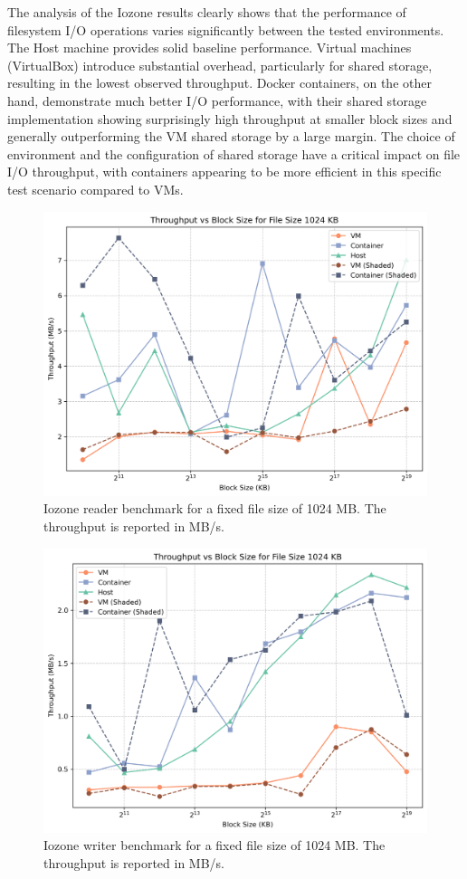 The analysis of the Iozone results clearly shows that the performance of filesystem I/O operations varies significantly between the tested environments. The Host machine provides solid baseline performance. Virtual machines (VirtualBox) introduce substantial overhead, particularly for shared storage, resulting in the lowest observed throughput. Docker containers, on the other hand, demonstrate much better I/O performance, with their shared storage implementation showing surprisingly high throughput at smaller block sizes and generally outperforming the VM shared storage by a large margin. The choice of environment and the configuration of shared storage have a critical impact on file I/O throughput, with containers appearing to be more efficient in this specific test scenario compared to VMs. 

\begin{figure}
    \centering
    \includegraphics[width=0.8\linewidth]{assets/reader_filesize_1024.png}
    \caption{Iozone reader benchmark for a fixed file size of 1024 MB. The throughput is reported in MB/s.}
    \label{fig:reader_filesize_1024}
\end{figure}

\begin{figure}
    \centering
    \includegraphics[width=0.8\linewidth]{assets/writer_filesize_1024.png}
    \caption{Iozone writer benchmark for a fixed file size of 1024 MB. The throughput is reported in MB/s.}
    \label{fig:writer_filesize_1024}
\end{figure}

